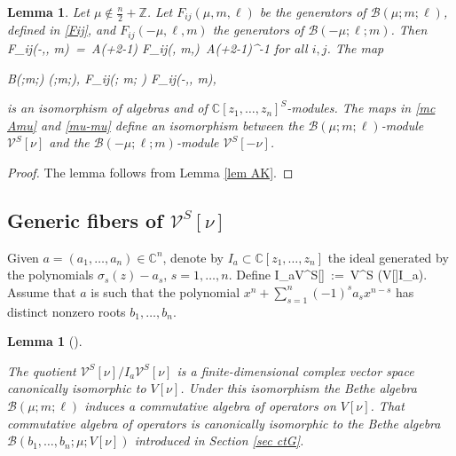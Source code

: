 \documentclass[12pt]{amsart}
\newtheorem{lem}[thm]{Lemma}
\numberwithin{equation}{section}
\theoremstyle{definition}
\let\mc\mathcal
\let\si\sigma
\let\ox\otimes
\def\C{{\mathbb C}}
\def\Z{{\mathbb Z}}
\def\B{{\mc B}}
\def\V{{\mc V}}
\begin{document}
\begin{lem}
\label{lem BB iso}
Let $\mu \notin \frac n2 + \Z$. Let $F_{ij}(\mu, m,\ell)$ be the generators
of $\B(\mu;m;\ell)$, defined in \eqref{Fij},  and
$F_{ij}(-\mu,\ell, m)$  the generators
of $\B(-\mu;\ell;m)$.  Then
\bean
\label{Fij iso}
F_{ij}(-\mu,\ell, m) \,=\,
\mc A\Big(\mu +\frac {\nu}2-1\Big) F_{ij}(\mu, m,\ell)\,
\mc A\Big(\mu +\frac {\nu}2-1\Big)^{-1}
\eean
for all $i,j$. 
The map
 
\bean
\label{mu-mu}
\B(\mu;m;\ell) \to \B(\mu;m;\ell), \quad F_{ij}(\mu; m; \ell)
\mapsto
F_{ij}(-\mu,\ell, m),
\eean

\smallskip
\noindent
is an isomorphism of algebras and of $\C[z_1,\dots,z_n]^S$-modules.
The maps  in \eqref{mc Amu} and \eqref{mu-mu} define an isomorphism
between the $\B(\mu;m;\ell)$-module $\V^S[\nu]$
and the $\B(-\mu;\ell;m)$-module $\V^S[-\nu]$.


\end{lem}

\begin{proof}
The lemma follows from Lemma \ref{lem AK}.
\end{proof}

\subsection{Generic fibers of $\V^S[\nu]$}

Given $a=(a_1,\dots,a_n)\in \C^n$, denote by $I_a\subset \C[z_1,\dots, z_n]$ the ideal
generated by the polynomials  $\si_s(z)-a_s$, $s=1,\dots,n$. Define
\bean
\label{ide}
 I_a\V^S[\nu] \,:=\, \V^S \cap (V[\nu]\ox I_a).
\eean
Assume that $a$ is such that the polynomial $x^n + \sum_{s=1}^n(-1)^s a_sx^{n-s}$ has distinct
nonzero roots  $b_1,\dots,b_n$.

\begin{lem}
[{\cite[Lemma 2.13]{MTV3}}]
\label{lem fib}

The quotient $\V^S[\nu]/ I_a\V^S[\nu]$ is a finite-dimensional complex vector space canonically isomorphic
to $V[\nu]$. Under this isomorphism
the  Bethe algebra $\B(\mu; m;\ell)$ induces a commutative algebra of  operators on 
$V[\nu]$. That commutative algebra of operators is canonically isomorphic to the Bethe algebra
$\B(b_1,\dots,b_n; \mu; V[\nu])$ introduced in Section \ref{sec ctG}.

\end{lem}
\end{document}
